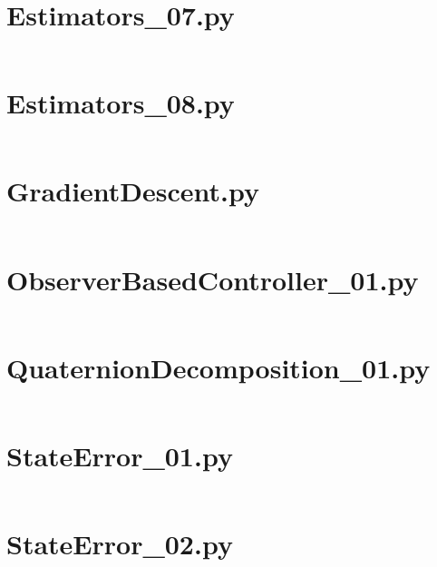 \pagebreak
\section*{Estimators\_07.py}\label{code:TSatPySamples/Estimators_07.py}\inputminted[linenos,fontsize=\scriptsize]{python}{/home/dcouture/git/mathyourlife/TSatPy/tex/sample_scripts/Estimators_07.py}

\pagebreak
\section*{Estimators\_08.py}\label{code:TSatPySamples/Estimators_08.py}\inputminted[linenos,fontsize=\scriptsize]{python}{/home/dcouture/git/mathyourlife/TSatPy/tex/sample_scripts/Estimators_08.py}

\pagebreak
\section*{GradientDescent.py}\label{code:TSatPySamples/GradientDescent.py}\inputminted[linenos,fontsize=\scriptsize]{python}{/home/dcouture/git/mathyourlife/TSatPy/tex/sample_scripts/GradientDescent.py}

\pagebreak
\section*{ObserverBasedController\_01.py}\label{code:TSatPySamples/ObserverBasedController_01.py}\inputminted[linenos,fontsize=\scriptsize]{python}{/home/dcouture/git/mathyourlife/TSatPy/tex/sample_scripts/ObserverBasedController_01.py}

\pagebreak
\section*{QuaternionDecomposition\_01.py}\label{code:TSatPySamples/QuaternionDecomposition_01.py}\inputminted[linenos,fontsize=\scriptsize]{python}{/home/dcouture/git/mathyourlife/TSatPy/tex/sample_scripts/QuaternionDecomposition_01.py}

\pagebreak
\section*{StateError\_01.py}\label{code:TSatPySamples/StateError_01.py}\inputminted[linenos,fontsize=\scriptsize]{python}{/home/dcouture/git/mathyourlife/TSatPy/tex/sample_scripts/StateError_01.py}

\pagebreak
\section*{StateError\_02.py}\label{code:TSatPySamples/StateError_02.py}\inputminted[linenos,fontsize=\scriptsize]{python}{/home/dcouture/git/mathyourlife/TSatPy/tex/sample_scripts/StateError_02.py}

